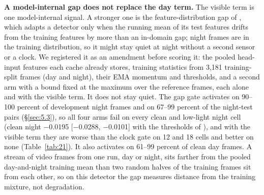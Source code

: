 \documentclass[10pt]{article}
\begin{document}
\textbf{A model-internal gap does not replace the day term.} The visible term is one model-internal signal. A stronger one is the feature-distribution gap of \citet{yoo2024what}, which adapts a detector only when the running mean of its test features drifts from the training features by more than an in-domain gap; night frames are in the training distribution, so it might stay quiet at night without a second sensor or a clock. We registered it as an amendment before scoring it: the pooled head-input features each cache already stores, training statistics from 3,181 training-split frames (day and night), their EMA momentum and thresholds, and a second arm with a bound fixed at the maximum over the reference frames, each alone and with the visible term. It does not stay quiet. The gap gate activates on 90--100 percent of development night frames and on 67--99 percent of the night-test pairs (\S\ref{sec:5.3}), so all four arms fail on every clean and low-light night cell (clean night $-$0.0195 [$-$0.0288, $-$0.0101] with the thresholds of \citet{yoo2024what}), and with the visible term they are worse than the clock gate on 12 and 18 cells and better on none (Table~\ref{tab:21}). It also activates on 61--99 percent of clean day frames. A stream of video frames from one run, day or night, sits farther from the pooled day-and-night training mean than two random halves of the training frames sit from each other, so on this detector the gap measures distance from the training mixture, not degradation.
\end{document}
